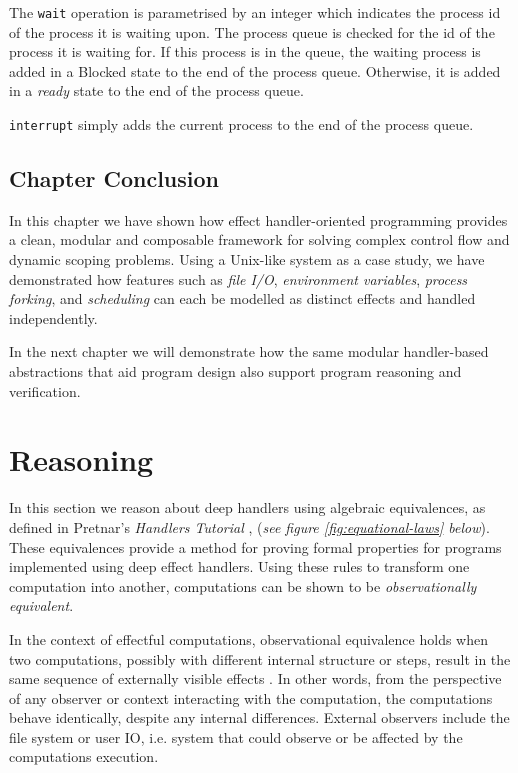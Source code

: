 \documentclass[logo,bsc,singlespacing,parskip]{infthesis}
\begin{document}
The \lstinline{wait} operation is parametrised by an integer which indicates the process id of the process it is waiting upon. The process queue is checked for the id of the process it is waiting for. If this process is in the queue, the waiting process is added in a Blocked state to the end of the process queue. Otherwise, it is added in a \textit{ready} state to the end of the process queue.

\lstinline{interrupt} simply adds the current process to the end of the process queue.

\section{Chapter Conclusion}

In this chapter we have shown how effect handler-oriented programming provides a clean, modular and composable framework for solving complex control flow and dynamic scoping problems. Using a Unix-like system as a case study, we have demonstrated how features such as \textit{file I/O}, \textit{environment variables}, \textit{process forking}, and \textit{scheduling} can each be modelled as distinct effects and handled independently. 


In the next chapter we will demonstrate how the same modular handler-based abstractions that aid program design also support program reasoning and verification.




\chapter{Reasoning}

In this section we reason about deep handlers using algebraic equivalences, as defined in Pretnar's \textit{Handlers Tutorial} \cite{pretnar_introduction_2015}, (\textit{see figure \ref{fig:equational-laws} below}).  These equivalences provide a method for proving formal properties for  programs implemented using deep effect handlers. Using these rules to transform one computation into another, computations can be shown to be \textit{observationally equivalent}.

In the context of effectful computations, observational equivalence holds when two computations, possibly with different internal structure or steps, result in the same sequence of externally visible effects \cite{sannella1987observational}. In other words, from the perspective of any observer or context interacting with the computation, the computations behave identically, despite any internal differences. External observers include the file system or user IO, i.e. system that could observe or be affected by the computations execution.
\end{document}
